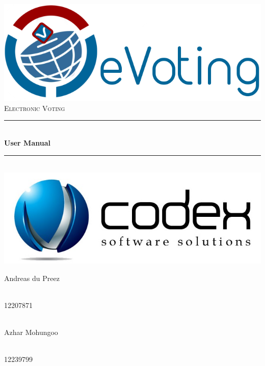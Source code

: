 \begin{titlepage}
	
	\begin{center}
		\includegraphics[width=0.7\linewidth]{../Images/eVoting_Logo.png}\\[2cm]    
		\textsc{\LARGE Electronic Voting}\\[0.5cm]
		\rule{\linewidth}{0.5mm} \\[1cm]
		{ \huge \bfseries User Manual}\\[0.5cm]
		\rule{\linewidth}{0.5mm} \\[1cm]
		
		\includegraphics[width=0.5\linewidth]{../Images/TeamCodexLogo.jpg}\\[0.5cm]    	
		
		
		\begin{minipage}{0.4\textwidth}
			\begin{flushleft} \large
				Andreas {du Preez}
			\end{flushleft}
		\end{minipage}
		\begin{minipage}{0.4\textwidth}
			\begin{flushright} \large
				\emph{} \\
				12207871 
			\end{flushright}
		\end{minipage}
		
		
		\begin{minipage}{0.4\textwidth}
			\begin{flushleft} \large
				\emph{} \\
				Azhar {Mohungoo }
			\end{flushleft}
		\end{minipage}
		\begin{minipage}{0.4\textwidth}
			\begin{flushright} \large
				\emph{} \\
				12239799
			\end{flushright}
		\end{minipage}
		

\end{center}
\end{titlepage}
